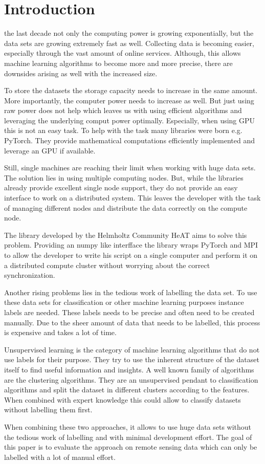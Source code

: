 
\section{Introduction}
\label{sec:intro}
 the last decade not only the computing power is growing exponentially, but the data sets are growing extremely fast as well.
Collecting data is becoming easier, especially through the vast amount of online services.
Although, this allows machine learning algorithms to become more and more precise, there are downsides arising as well with
the increased size.

To store the datasets the storage capacity needs to increase in the same amount. More importantly, the computer power needs to increase
as well. But just using raw power does not help which leaves us with using efficient algorithms and leveraging the underlying comput power optimally.
Especially, when using \gls{GPU} this is not an easy task. To help with the task many libraries were born e.g. PyTorch.
They provide mathematical computations efficiently implemented and leverage an \gls{GPU} if available.

Still, single machines are reaching their limit when working with huge data sets. The solution lies in using multiple computing nodes.
But, while the libraries already provide excellent single node support, they do not provide an easy interface to work on a distributed system.
This leaves the developer with the task of managing different nodes and distribute the data correctly on the compute node.

The library developed by the Helmholtz Community \gls{HeAT} aims to solve this problem.
Providing an \gls{numpy} like interfface the library wraps \gls{PyTorch} and \gls{MPI} to allow the developer to write his script on a single computer
and perform it on a distributed compute cluster without worrying about the correct synchronization.

Another rising problems lies in the tedious work of labelling the data set.
To use these data sets for classification or other machine learning purposes instance labels are needed.
These labels needs to be precise and often need to be created manually.
Due to the sheer amount of data that needs to be labelled, this process is expensive and takes a lot of time.

Unsupervised learning is the category of machine learning algorithms that do not use labels for their purpose. They try to
use the inherent structure of the dataset itself to find useful information and insights.
A well known family of algorithms are the clustering algorithms. They are an unsupervised pendant to classification algorithms
and split the dataset in different clusters according to the features.
When combined with expert knowledge this could allow to classify datasets without labelling them first.

When combining these two approaches, it allows to use huge data sets without the tedious work of labelling and with minimal development effort.
The goal of this paper is to evaluate the approach on remote sensing data which can only be labelled with a lot of manual effort.
